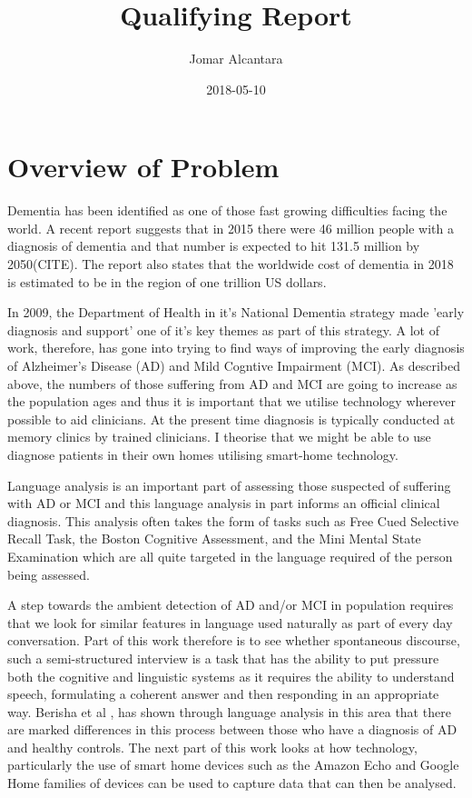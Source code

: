 \documentclass{article}
\title{Qualifying Report}
\date{2018-05-10}
\author{Jomar Alcantara}
\begin{document}
	\maketitle
	\newpage
	\section{Overview of Problem}
	Dementia has been identified as one of those fast growing difficulties facing the world. A recent report suggests that in 2015 there were 46 million people with a diagnosis of dementia and that number is expected to hit 131.5 million by 2050(CITE). The report also states that the worldwide cost of dementia in 2018 is estimated to be in the region of one trillion US dollars.
	\newline
	\par
	In 2009, the Department of Health in it's National Dementia strategy made 'early diagnosis and support' one of it's key themes as part of this strategy. A lot of work, therefore, has gone into trying to find ways of improving the early diagnosis of Alzheimer's Disease (AD) and Mild Cogntive Impairment (MCI). As described above, the numbers of those suffering from AD and MCI are going to increase as the population ages and thus it is important that we utilise technology wherever possible to aid clinicians. At the present time diagnosis is typically conducted at memory clinics by trained clinicians. I theorise that we might be able to use diagnose patients in their own homes utilising smart-home technology. 
	\newline
	\par
	Language analysis is an important part of assessing those suspected of suffering with AD or MCI and this language analysis in part informs an official clinical diagnosis. This analysis often takes the form of tasks such as Free Cued Selective Recall Task, the Boston Cognitive Assessment, and the Mini Mental State Examination which are all quite targeted in the language required of the person being assessed. 
	\newline
	\par
	A step towards the ambient detection of AD and/or MCI in population requires that we look for similar features in language used naturally as part of every day conversation. Part of this work therefore is to see whether spontaneous discourse, such a semi-structured interview is a task that has the ability to put pressure both the cognitive and linguistic systems as it requires the ability to understand speech, formulating a coherent answer and then responding in an appropriate way. Berisha et al \cite{Berisha2015}, has shown through language analysis in this area that there are marked differences in this process between those who have a diagnosis of AD and healthy controls. The next part of this work looks at how technology, particularly the use of smart home devices such as the Amazon Echo and Google Home families of devices can be used to capture data that can then be analysed.
\end{document}
